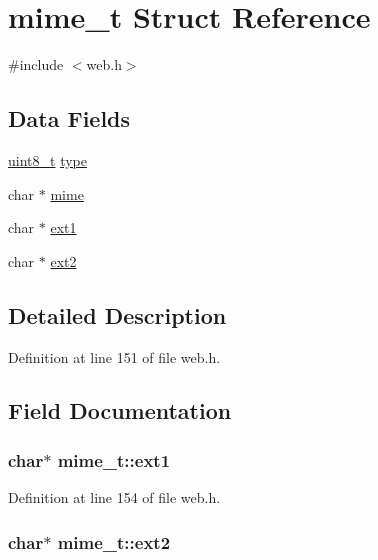 \hypertarget{structmime__t}{}\section{mime\+\_\+t Struct Reference}
\label{structmime__t}


{\ttfamily \#include $<$web.\+h$>$}

\subsection*{Data Fields}
\begin{DoxyCompactItemize}
\item 
\hyperlink{send_8c_aba7bc1797add20fe3efdf37ced1182c5}{uint8\+\_\+t} \hyperlink{structmime__t_ae69826dcfd475d65fa0fe8a1574bb3af}{type}
\item 
char $\ast$ \hyperlink{structmime__t_ad796d16eaee60d7435bff66b2e9b8a8d}{mime}
\item 
char $\ast$ \hyperlink{structmime__t_a22af12abb536a48d3425a3a4d1cce2a4}{ext1}
\item 
char $\ast$ \hyperlink{structmime__t_ae16e9342ecd4df97a2564658f1f506b1}{ext2}
\end{DoxyCompactItemize}


\subsection{Detailed Description}


Definition at line 151 of file web.\+h.



\subsection{Field Documentation}
\subsubsection[{\texorpdfstring{ext1}{ext1}}]{\setlength{\rightskip}{0pt plus 5cm}char$\ast$ mime\+\_\+t\+::ext1}\hypertarget{structmime__t_a22af12abb536a48d3425a3a4d1cce2a4}{}\label{structmime__t_a22af12abb536a48d3425a3a4d1cce2a4}


Definition at line 154 of file web.\+h.

\subsubsection[{\texorpdfstring{ext2}{ext2}}]{\setlength{\rightskip}{0pt plus 5cm}char$\ast$ mime\+\_\+t\+::ext2}\hypertarget{structmime__t_ae16e9342ecd4df97a2564658f1f506b1}{}\label{structmime__t_ae16e9342ecd4df97a2564658f1f506b1}


